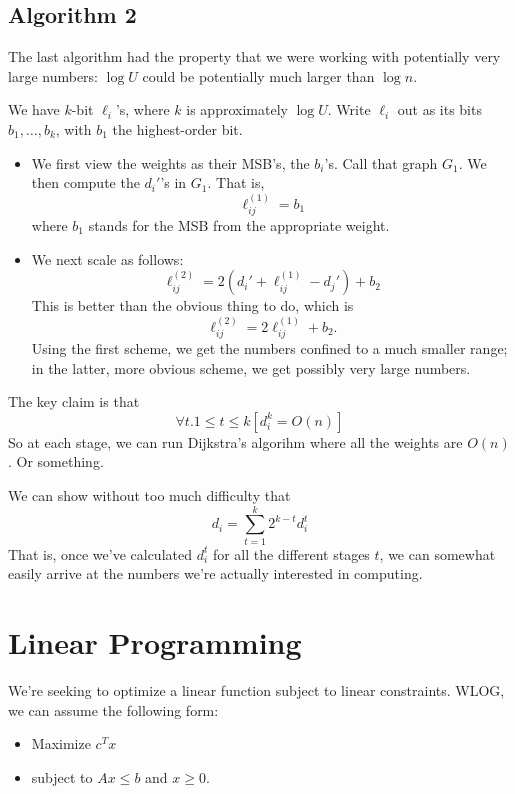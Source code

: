 \documentclass{article}
\begin{document}
\subsection{Algorithm 2}

The last algorithm had the property that we were working with potentially very
large numbers: $\log U$ could be potentially much larger than $\log n$.

We have $k$-bit $\ell_i$'s, where $k$ is approximately $\log U$.
Write $\ell_i$ out as its bits $b_1,\ldots, b_k$, with $b_1$ the highest-order
bit.

\begin{itemize}

\item
We first view the weights as their MSB's, the $b_i$'s. Call that graph $G_1$.
We then compute the $d_i'$'s in $G_1$.
That is, 
$$
\ell_{ij}^{(1)} = b_1
$$
where $b_1$ stands for the MSB from the appropriate weight.

\item
We next scale as follows:
$$
\ell_{ij}^{(2)} =
2(d_i' + \ell_{ij}^{(1)} -d_j') +
 b_2
$$
This is better than the obvious thing to do, which is
$$
\ell_{ij}^{(2)} =
2 \ell_{ij}^{(1)} +
 b_2.
$$
Using the first scheme, we get the numbers confined to a much smaller range;
in the latter, more obvious scheme, we get possibly very large numbers.

\end{itemize}

The key claim is that
$$
\forall t. 1\leq t \leq k\left[
	d_i^k = O(n)
\right]
$$
So at each stage, we can run Dijkstra's algorihm where all the weights are 
$O(n)$. Or something.

We can show without too much difficulty that
$$
d_i = \sum_{t = 1}^k 2^{k - t} d_i^t
$$
That is, once we've calculated $d_i^t$ for all the different stages $t$, we
can somewhat easily arrive at the numbers we're actually interested in 
computing.



\section{Linear Programming}

We're seeking to optimize a linear function subject to linear constraints.
WLOG, we can assume the following form:
\begin{itemize}
	\item Maximize $c^Tx$
	\item
	subject to $Ax \leq b$ and $x \geq 0$.
\end{itemize}
\end{document}
